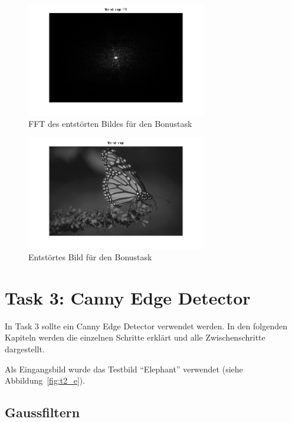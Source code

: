 \begin{figure}[htb]
 \centering
 \includegraphics[width=0.7\textwidth]{../images_out/b_filtered_fft.png}
 \caption{FFT des entstörten Bildes für den Bonustask}
 \label{fig:b_filtered_fft}
\end{figure}

\begin{figure}[htb]
 \centering
 \includegraphics[width=0.7\textwidth]{../images_out/b_filtered.png}
 \caption{Entstörtes Bild für den Bonustask}
 \label{fig:b_filtered}
\end{figure}

\clearpage




\chapter{Task 3: Canny Edge Detector}

In Task 3 sollte ein Canny Edge Detector verwendet werden. In den folgenden Kapiteln werden die einzelnen Schritte erklärt und alle Zwischenschritte dargestellt.

Als Eingangsbild wurde das Testbild ``Elephant'' verwendet (siehe Abbildung~\ref{fig:t2_e}).


\section{Gaussfiltern}

